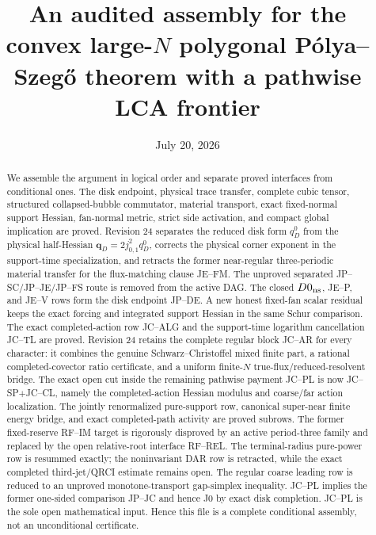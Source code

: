 \documentclass[11pt]{amsart}
\title[Audited convex large-$N$ polygonal assembly]
{An audited assembly for the convex large-$N$ polygonal
P\'olya--Szeg\H{o} theorem with a pathwise LCA frontier}
\author{}
\date{July 20, 2026}
\numberwithin{equation}{section}
\theoremstyle{definition}
\theoremstyle{remark}
\begin{document}
\begin{abstract}
We assemble the argument in logical order and separate proved interfaces
from conditional ones.  The disk endpoint, physical trace transfer,
complete cubic tensor, structured collapsed-bubble commutator, material
transport, exact fixed-normal support Hessian, fan-normal metric, strict
side activation, and compact global implication are proved.  Revision 24
separates the reduced disk form $q_D^0$ from the physical half-Hessian
$\mathbf q_D=2j_{0,1}^2q_D^0$, corrects the physical corner exponent in
the support-time specialization, and retracts the former near-regular
three-periodic material transfer for the flux-matching clause JE--FM.
The unproved separated JP--SC/JP--JE/JP--FS route is removed from the
active DAG.  The closed $D0_{\rm ns}$, JE--P, and JE--V
rows form the disk endpoint JP--DE.  A new honest fixed-fan scalar residual
keeps the exact forcing and integrated support Hessian in the same Schur
comparison.  The exact completed-action row JC--ALG and the support-time
logarithm cancellation JC--TL are proved.  Revision 24 retains the complete
regular block JC--AR for every character: it combines the genuine
Schwarz--Christoffel mixed finite part, a rational completed-covector ratio
certificate, and a uniform finite-$N$ true-flux/reduced-resolvent bridge.
The exact open cut inside the remaining pathwise payment JC--PL is now
JC--SP$+$JC--CL, namely the completed-action Hessian modulus and coarse/far
action localization.  The jointly renormalized pure-support row, canonical
super-near finite energy bridge, and exact completed-path activity are
proved subrows.  The former fixed-reserve RF--IM target is rigorously
disproved by an active period-three family and replaced by the open
relative-root interface RF--REL.  The terminal-radius pure-power row is
resummed exactly; the noninvariant DAR row is retracted, while the exact
completed third-jet/QRCI estimate remains open.  The regular coarse leading
row is reduced to an unproved monotone-transport gap-simplex inequality.
JC--PL implies the former one-sided comparison
JP--JC and hence J0 by exact disk completion.  JC--PL is the sole open
mathematical input.  Hence this file is a complete conditional assembly,
not an unconditional certificate.
\end{abstract}

\maketitle
\tableofcontents
\end{document}
